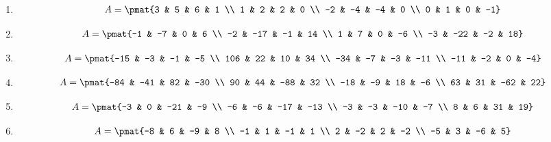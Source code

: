 \begin{enumerate}
\item

\begin{align*}
A = \pmat{3 & 5 & 6 & 1 \\ 1 & 2 & 2 & 0 \\ -2 & -4 & -4 & 0 \\ 0 & 1 & 0 & -1}
\end{align*}

\item

\begin{align*}
A = \pmat{-1 & -7 & 0 & 6 \\ -2 & -17 & -1 & 14 \\ 1 & 7 & 0 & -6 \\ -3 & -22 & -2 & 18}
\end{align*}

\item

\begin{align*}
A = \pmat{-15 & -3 & -1 & -5 \\ 106 & 22 & 10 & 34 \\ -34 & -7 & -3 & -11 \\ -11 & -2 & 0 & -4}
\end{align*}

\item

\begin{align*}
A = \pmat{-84 & -41 & 82 & -30 \\ 90 & 44 & -88 & 32 \\ -18 & -9 & 18 & -6 \\ 63 & 31 & -62 & 22}
\end{align*}

\item

\begin{align*}
A = \pmat{-3 & 0 & -21 & -9 \\ -6 & -6 & -17 & -13 \\ -3 & -3 & -10 & -7 \\ 8 & 6 & 31 & 19}
\end{align*}

\item

\begin{align*}
A = \pmat{-8 & 6 & -9 & 8 \\ -1 & 1 & -1 & 1 \\ 2 & -2 & 2 & -2 \\ -5 & 3 & -6 & 5}
\end{align*}


\end{enumerate}
